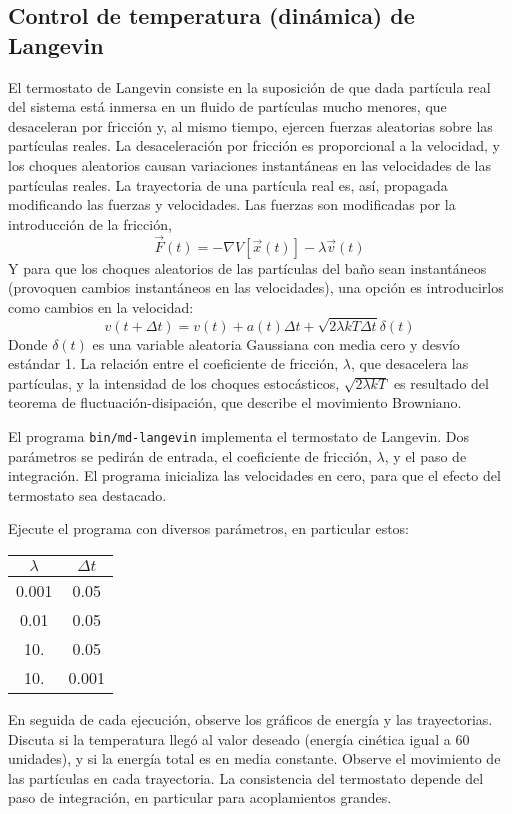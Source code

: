 \documentclass[10pt,a4paper,ssfamily]{exam}
\newcommand{\1}{{\bf 1}}
\newcommand{\2}{{\bf 2}}
\newcommand{\3}{{\bf 3}}
\begin{document}
\subsection{Control de temperatura (dinámica) de Langevin}

El termostato de Langevin consiste en la suposición de que dada
partícula real del sistema está inmersa en un fluido de partículas mucho
menores, que desaceleran por fricción y, al mismo tiempo,
ejercen fuerzas aleatorias sobre las partículas reales. La
desaceleración por fricción es proporcional a la velocidad, y los
choques aleatorios causan variaciones instantáneas en las velocidades de
las partículas reales. La trayectoria de una partícula real es, así,
propagada modificando las fuerzas y velocidades. Las fuerzas son
modificadas por la introducción de la fricción,
\[
\vec{F}(t) = -\nabla V[\vec{x}(t)] - \lambda \vec{v}(t)
\]
Y para que los choques aleatorios de las partículas del baño sean
instantáneos (provoquen cambios instantáneos en las velocidades), una
opción es introducirlos como cambios en la velocidad:
\[
v(t+\Delta t) = v(t) + a(t)\Delta t 
+ \sqrt{2\lambda kT \Delta t}\delta(t)
\] 
Donde $\delta(t)$ es una variable aleatoria Gaussiana con media cero y
desvío estándar 1. La relación entre el coeficiente de fricción, $\lambda$,
que desacelera las partículas, y la intensidad de los choques
estocásticos, $\sqrt{2\lambda kT}$ es resultado del teorema de
fluctuación-disipación, que describe el movimiento Browniano.

El programa {\tt bin/md-langevin} implementa el termostato de Langevin.
Dos parámetros se pedirán de entrada, el coeficiente de fricción,
$\lambda$, y el paso de integración. El programa inicializa las velocidades
en cero, para que el efecto del termostato sea destacado.

Ejecute el programa con diversos parámetros, en particular estos:

{\tt \begin{center}\begin{tabular}{cc}
\hline
 $\lambda$ & $\Delta t$ \\
\hline
0.001 & 0.05 \\
0.01  & 0.05 \\
10.   & 0.05 \\
10.   & 0.001 \\
\hline
\end{tabular}\end{center}}

En seguida de cada ejecución, observe los gráficos de energía y las
trayectorias. Discuta si la temperatura llegó al valor deseado (energía
cinética igual a 60 unidades), y si la energía total es en media
constante. Observe el movimiento de las partículas en cada trayectoria. 
La consistencia del termostato depende del paso de integración, en
particular para acoplamientos grandes.  
\end{document}

